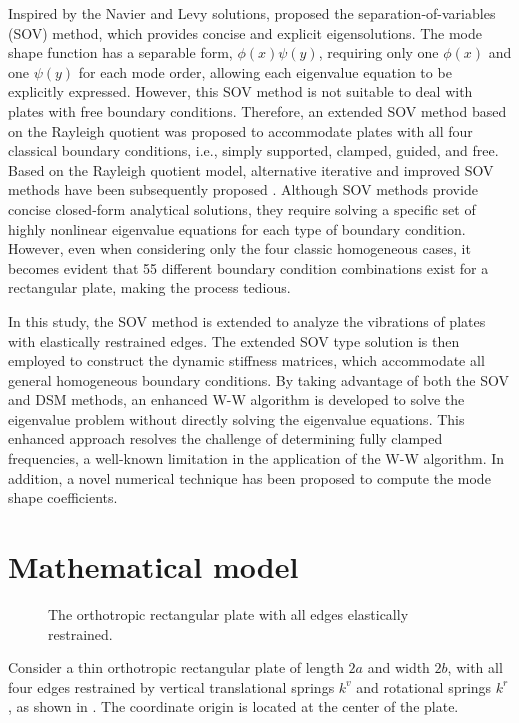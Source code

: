 \documentclass[preprint,12pt]{elsarticle}
\begin{document}
Inspired by the Navier and Levy solutions, \citet{xing2009new} proposed the separation-of-variables (SOV) method, which provides concise and explicit eigensolutions.
The mode shape function has a separable form, $\phi(x) \psi(y)$, requiring only one $\phi(x)$ and one $\psi(y)$ for each mode order, allowing each eigenvalue equation to be explicitly expressed.
However, this SOV method is not suitable to deal with plates with free boundary conditions.
Therefore, an extended SOV method \cite{xing2018overall, xing2020extended} based on the Rayleigh quotient was proposed to accommodate plates with all four classical boundary conditions, i.e., simply supported, clamped, guided, and free.
Based on the Rayleigh quotient model, alternative iterative and improved SOV methods have been subsequently proposed \cite{xing2020improved}.
Although SOV methods provide concise closed-form analytical solutions, they require solving a specific set of highly nonlinear eigenvalue equations for each type of boundary condition.
However, even when considering only the four classic homogeneous cases, it becomes evident that 55 different boundary condition combinations exist for a rectangular plate, making the process tedious.

In this study, the SOV method is extended to analyze the vibrations of plates with elastically restrained edges.
The extended SOV type solution is then employed to construct the dynamic stiffness matrices, which accommodate all general homogeneous boundary conditions.
By taking advantage of both the SOV and DSM methods, an enhanced W-W algorithm is developed to solve the eigenvalue problem without directly solving the eigenvalue equations.
This enhanced approach resolves the challenge of determining fully clamped frequencies, a well-known limitation in the application of the  W-W algorithm.
In addition, a novel numerical technique has been proposed to compute the mode shape coefficients.


\FloatBarrier
\section{Mathematical model}\label{sec:Mathematical model}
\begin{figure}[!htbp]
	\centering
	\resizebox{0.8\textwidth}{!}
	{
		
	}
	\caption{\small The orthotropic rectangular plate with all edges elastically restrained.} 
	\label{fig:platemode}
\end{figure}
Consider a thin orthotropic rectangular plate of length \(2a\) and width \(2b\), with all four edges restrained by vertical translational springs \(k^v\) and rotational springs \(k^r\), as shown in . 
The coordinate origin is located at the center of the plate.
\end{document}

